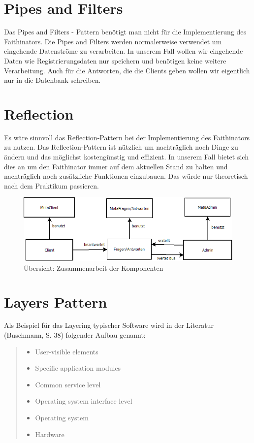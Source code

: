 \documentclass{scrreprt}
\begin{document}
\chapter{Pipes and Filters}
Das Pipes and Filters - Pattern benötigt man nicht für die Implementierung des Faithinators. Die Pipes and Filters werden normalerweise verwendet um eingehende Datenströme zu verarbeiten. In unserem Fall wollen wir eingehende Daten wie Registrierungsdaten nur speichern und benötigen keine weitere Verarbeitung. Auch für die Antworten, die die Clients geben wollen wir eigentlich nur in die Datenbank schreiben.

\chapter{Reflection}
Es wäre sinnvoll das Reflection-Pattern bei der Implementierung des Faithinators zu nutzen. Das Reflection-Pattern ist nützlich um nachträglich noch Dinge zu ändern und das möglichst kostengünstig und effizient. In unserem Fall bietet sich dies an um den Faithinator immer auf dem aktuellen Stand zu halten und nachträglich noch zusätzliche Funktionen einzubauen. Das würde nur theoretisch nach dem  Praktikum passieren.
\begin{figure}[ht]
 \includegraphics[width=\textwidth]{./pics/Reflect.png}
 \caption{Übersicht: Zusammenarbeit der Komponenten}
 \label{abb:3}
\end{figure}

\chapter{Layers Pattern}
Als Beispiel für das Layering typischer Software wird in der Literatur (Buschmann, S. 38) folgender Aufbau genannt:

\begin{quote}
\begin{itemize}
 \item User-visible elements
 \item Specific application modules
 \item Common service level
 \item Operating system interface level
 \item Operating system
 \item Hardware
\end{itemize}
\end{quote}
\end{document}
